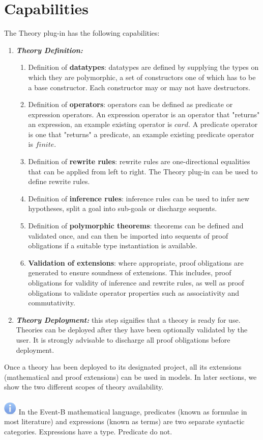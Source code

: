 \documentclass{article}      %
\begin{document}
\section{Capabilities}
The Theory plug-in has the following capabilities:
\begin{enumerate}
	\item \textbf{\textit{Theory Definition:}}
		\begin{enumerate}
			\item Definition of \textbf{datatypes}: datatypes are defined by supplying the types on which they are polymorphic, a set of constructors one of which has to be a base constructor. Each constructor may or may not have destructors.
			\item Definition of \textbf{operators}: operators can be defined as predicate or expression operators. An expression operator is an operator that "returns" an expression, an example existing operator is $card$. A predicate operator is one that "returns" a predicate, an example existing predicate operator is $finite$.
			\item Definition of \textbf{rewrite rules}: rewrite rules are one-directional equalities that can be applied from left to right. The Theory plug-in can be used to define rewrite rules.
			\item Definition of \textbf{inference rules}: inference rules can be used to infer new hypotheses, split a goal into sub-goals or discharge sequents.
			\item Definition of \textbf{polymorphic theorems}: theorems can be defined and validated once, and can then be imported into sequents of proof obligations if a suitable type instantiation is available.
			\item \textbf{Validation of extensions}: where appropriate, proof obligations are generated to ensure soundness of extensions. This includes, proof obligations for validity of inference and rewrite rules, as well as proof obligations to validate operator properties such as associativity and commutativity.
		\end{enumerate}
	\item \textbf{\textit{Theory Deployment:}} this step signifies that a theory is ready for use. Theories can be deployed after they have been optionally validated by the user. It is strongly advisable to discharge all proof obligations before deployment.
\end{enumerate}
Once a theory has been deployed to its designated project, all its extensions (mathematical and proof extensions) can be used in models. In later sections, we show the two different scopes of theory availability.
\\
\\
\includegraphics{images/info.png} In the Event-B mathematical language, predicates (known as formulae in most literature) and expressions (known as terms) are two separate syntactic categories. Expressions have a type. Predicate do not.



\end{document}
